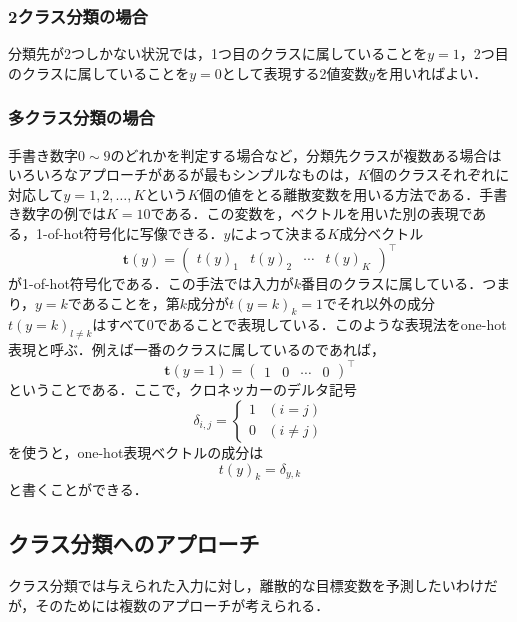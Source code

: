 \documentclass[a4paper,11pt]{jsreport}
\begin{document}
\subsubsection*{2クラス分類の場合}
分類先が2つしかない状況では，1つ目のクラスに属していることを$y=1$，2つ目のクラスに属していることを$y=0$として表現する2値変数$y$を用いればよい．
\subsubsection*{多クラス分類の場合}
手書き数字$0 \sim 9$のどれかを判定する場合など，分類先クラスが複数ある場合はいろいろなアプローチがあるが最もシンプルなものは，$K$個のクラスそれぞれに対応して$y = 1, 2, \dots, K$という$K$個の値をとる離散変数を用いる方法である．手書き数字の例では$K = 10$である．この変数を，ベクトルを用いた別の表現である，1-of-hot符号化に写像できる．$y$によって決まる$K$成分ベクトル
\begin{equation}
  \bm{t}(y) = \begin{pmatrix}
    t(y)_1 & t(y)_2 & \cdots & t(y)_K
  \end{pmatrix}^{\top}
\end{equation}
が1-of-hot符号化である．この手法では入力が$k$番目のクラスに属している．つまり，$y=k$であることを，第$k$成分が$t(y=k)_{k} = 1$でそれ以外の成分$t(y=k)_{l \neq k}$はすべて0であることで表現している．このような表現法をone-hot表現と呼ぶ．例えば一番のクラスに属しているのであれば，
\begin{equation}
  \bm{t}(y=1) = \begin{pmatrix}
    1 & 0 & \cdots & 0
  \end{pmatrix}^{\top}
\end{equation}
ということである．ここで，クロネッカーのデルタ記号
\begin{equation}
  \delta_{i, j} 
  = \begin{cases}
    1 & (i = j) \\
    0 & (i \neq j)
  \end{cases}
\end{equation}
を使うと，one-hot表現ベクトルの成分は
\begin{equation}
  t(y)_k = \delta_{y, k}
  \label{one-hot成分}
\end{equation}
と書くことができる．

\subsection{クラス分類へのアプローチ}
クラス分類では与えられた入力に対し，離散的な目標変数を予測したいわけだが，そのためには複数のアプローチが考えられる．
\end{document}

